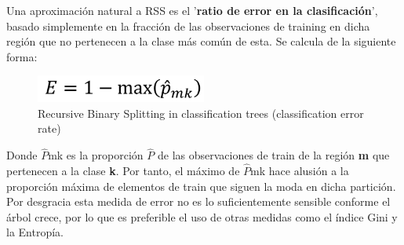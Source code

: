 Una aproximación natural a RSS es el '\textbf{ratio de error en la clasificación}', basado simplemente en la fracción de las observaciones de training en dicha región que no pertenecen a la clase más común de esta. Se calcula de la siguiente forma:

\begin{figure}[H]
	\centering
	\includegraphics[width=0.5\textwidth]{imagenes/cer} 
	\caption{Recursive Binary Splitting in classification trees (classification error rate) \cite{ref7}}
\end{figure}

Donde $\widehat{P}$mk es la proporción $\widehat{P}$ de las observaciones de train de la región \textbf{m} que pertenecen a la clase \textbf{k}. Por tanto, el máximo de $\widehat{P}$mk hace alusión a la proporción máxima de elementos de train que siguen la moda en dicha partición.\\
Por desgracia esta medida de error no es lo suficientemente sensible conforme el árbol crece, por lo que es preferible el uso de otras medidas como el índice Gini y la Entropía.

